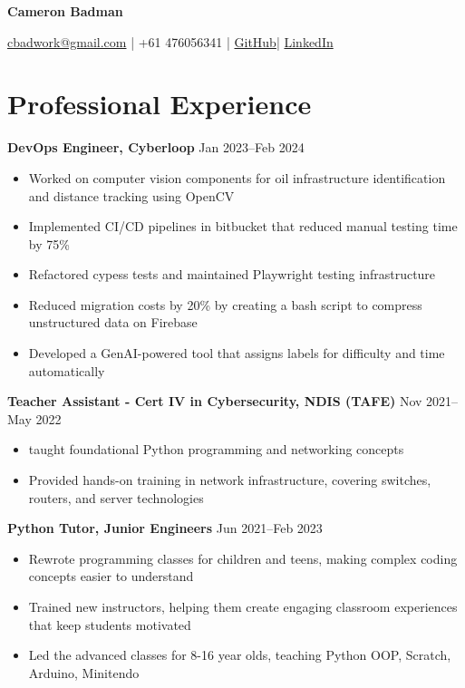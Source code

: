 \documentclass[10pt,a4paper]{article}
\begin{document}
	\begin{center}
		{\huge\textbf{Cameron Badman}}
		\begin{center}
			\href{mailto:cbadwork@gmail.com}{cbadwork@gmail.com} |
			+61 476056341 |
			\href{https://github.com/CameronBadman}{GitHub}| 
			\href{https://www.linkedin.com/in/cameron-badman-5314ba1b8/}{LinkedIn}
		\end{center}
	\end{center}
	
	\section{Professional Experience}
	\textbf{DevOps Engineer, Cyberloop} \hfill Jan 2023--Feb 2024 
	\begin{itemize}[label=\textbullet, itemsep=0.05cm]
		\item Worked on computer vision components for oil infrastructure identification and distance tracking using OpenCV
		\item Implemented CI/CD pipelines in bitbucket that reduced manual testing time by 75\%
		\item Refactored cypess tests and maintained Playwright testing infrastructure 
		\item Reduced migration costs by 20\% by creating a bash script to compress unstructured data on Firebase
		\item Developed a GenAI-powered tool that assigns labels for difficulty and time automatically
	\end{itemize}
	\vspace{0.1cm}
	
	\textbf{Teacher Assistant - Cert IV in Cybersecurity, NDIS (TAFE)} \hfill Nov 2021--May 2022 
	\begin{itemize}[label=\textbullet, itemsep=0.05cm]
		\item taught foundational Python programming and networking concepts
		\item Provided hands-on training in network infrastructure, covering switches, routers, and server technologies
	\end{itemize}
	\vspace{0.1cm}
	
	\textbf{Python Tutor, Junior Engineers} \hfill Jun 2021--Feb 2023 
	\begin{itemize}[label=\textbullet, itemsep=0.05cm]
		\item Rewrote programming classes for children and teens, making complex coding concepts easier to understand
		\item Trained new instructors, helping them create engaging classroom experiences that keep students motivated
		\item Led the advanced classes for 8-16 year olds, teaching Python OOP, Scratch, Arduino, Minitendo
	\end{itemize}
	\vspace{0.1cm}
	
\end{document}
